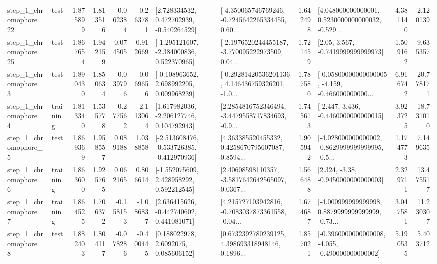 \begin{tabular}{llrrrrllrlrr}
    step\_1\_chromophore\_22 &      test &      1.875899 &    1.813516 &     -0.062384 & -0.263781 &    [2.728334532, 0.472702939, -0.540264529] &  [-4.350065746769246, -0.7245642265334455, 0.60... &       1.642498 &  [4.048000000000001, 0.5230000000000032, -0.529... &            4.381140 &          2.120139 \\
    step\_1\_chromophore\_25 &      test &      1.867654 &    1.942159 &      0.074505 &  0.912669 &   [-1.295121607, -2.384000836, 0.522370965] &  [-2.1976520244455187, -3.770095222973509, 0.04... &       1.721459 &                 [2.05, 3.567, -0.7419999999999973] &            1.509162 &          9.635357 \\
     step\_1\_chromophore\_3 &      test &      1.890430 &    1.850634 &     -0.039796 & -0.069656 &    [-0.108963652, 2.698992205, 0.009968239] &  [-0.29281420536201136, 4.146436759326201, -1.0... &       1.787580 &  [-0.05800000000000005, -4.159, -0.466000000000... &            6.916742 &         20.778171 \\
     step\_1\_chromophore\_4 &  training &      1.813340 &    1.535778 &     -0.277562 & -2.113064 &    [1.617982036, -2.206127746, 0.104792943] &  [2.2854816752346494, -3.4479558717834693, -0.9... &       1.745613 &               [-2.447, 3.436, -0.4460000000000015] &            3.923725 &         18.731010 \\
     step\_1\_chromophore\_5 &      test &      1.869369 &    1.958557 &      0.089188 &  1.038858 &  [-2.513608476, -0.533726385, -0.412970936] &  [4.363385520455332, 0.4258670795607087, 0.8594... &       1.905942 &  [-4.028000000000002, -0.8629999999999995, -0.5... &            1.174773 &          7.149635 \\
     step\_1\_chromophore\_6 &  training &      1.863600 &    1.925765 &      0.062165 &  0.806614 &    [-1.552075609, 2.428958292, 0.592212545] &  [2.40608598110357, -3.5817642642565097, 0.0367... &       1.566488 &                [2.324, -3.38, -0.9450000000000003] &            2.329711 &         13.475517 \\
     step\_1\_chromophore\_7 &  training &      1.864525 &    1.706372 &     -0.158153 & -1.086837 &    [2.636415626, -0.442740602, 0.441081071] &  [4.215727103942816, -0.7083037873361558, -0.04... &       1.674687 &  [-4.000999999999998, 0.8879999999999999, -0.73... &            3.047581 &         11.230307 \\
     step\_1\_chromophore\_8 &      test &      1.882403 &    1.804117 &     -0.078286 & -0.400445 &       [0.188022978, 2.6092075, 0.085606152] &  [0.6732392780239125, 4.398693318948146, 0.1896... &       1.857021 &  [-0.3960000000000008, -4.055, -0.490000000000002] &            5.190535 &          5.403712 \\

\end{tabular}
